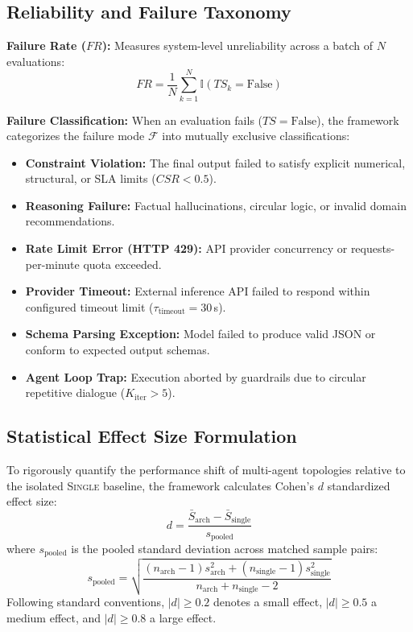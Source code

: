 \subsection{Reliability and Failure Taxonomy}
\textbf{Failure Rate ($FR$):} Measures system-level unreliability across a batch of $N$ evaluations:
\begin{equation}
FR = \frac{1}{N} \sum_{k=1}^N \mathbb{I}(TS_k = \text{False})
\end{equation}

\textbf{Failure Classification:} When an evaluation fails ($TS = \text{False}$), the framework categorizes the failure mode $\mathcal{F}$ into mutually exclusive classifications:
\begin{itemize}
    \item \textbf{Constraint Violation:} The final output failed to satisfy explicit numerical, structural, or SLA limits ($CSR < 0.5$).
    \item \textbf{Reasoning Failure:} Factual hallucinations, circular logic, or invalid domain recommendations.
    \item \textbf{Rate Limit Error (HTTP 429):} API provider concurrency or requests-per-minute quota exceeded.
    \item \textbf{Provider Timeout:} External inference API failed to respond within configured timeout limit ($\tau_{\text{timeout}} = 30\,$s).
    \item \textbf{Schema Parsing Exception:} Model failed to produce valid JSON or conform to expected output schemas.
    \item \textbf{Agent Loop Trap:} Execution aborted by guardrails due to circular repetitive dialogue ($K_{\text{iter}} > 5$).
\end{itemize}

\subsection{Statistical Effect Size Formulation}
To rigorously quantify the performance shift of multi-agent topologies relative to the isolated \textsc{Single} baseline, the framework calculates Cohen's $d$ standardized effect size:
\begin{equation}
d = \frac{\bar{S}_{\text{arch}} - \bar{S}_{\text{single}}}{s_{\text{pooled}}}
\end{equation}
where $s_{\text{pooled}}$ is the pooled standard deviation across matched sample pairs:
\begin{equation}
s_{\text{pooled}} = \sqrt{\frac{(n_{\text{arch}} - 1)s_{\text{arch}}^2 + (n_{\text{single}} - 1)s_{\text{single}}^2}{n_{\text{arch}} + n_{\text{single}} - 2}}
\end{equation}
Following standard conventions, $|d| \ge 0.2$ denotes a small effect, $|d| \ge 0.5$ a medium effect, and $|d| \ge 0.8$ a large effect.

